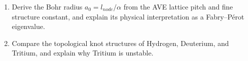 \begin{exercisebox}
\begin{enumerate}
    \item Derive the Bohr radius $a_0 = l_{node}/\alpha$ from the AVE lattice pitch and fine structure constant, and explain its physical interpretation as a Fabry--P\'{e}rot eigenvalue.
    \item Compare the topological knot structures of Hydrogen, Deuterium, and Tritium, and explain why Tritium is unstable.
\end{enumerate}
\end{exercisebox}


